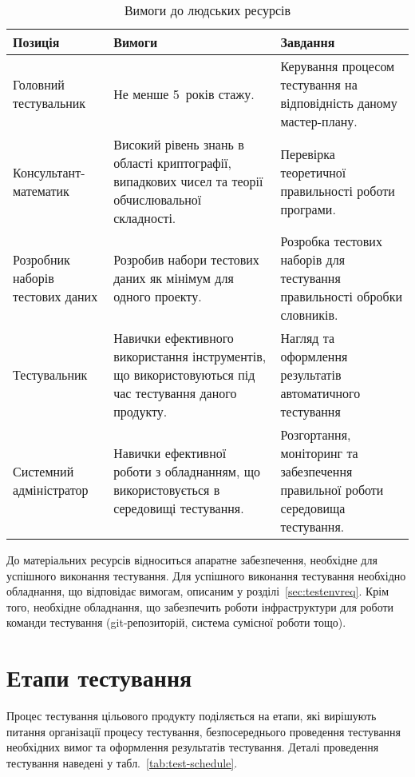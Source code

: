 \documentclass[a4paper,oneside,DIV=12,12pt]{scrartcl}
\begin{document}
		\begin{table}[h]
			\centering
			\begin{tabular}{v{0.2\textwidth}v{0.25\textwidth}v{0.4\textwidth}}
				\toprule
				Позиція & Вимоги & Завдання \\
				\midrule
				Головний тестувальник &
				Не менше 5~років стажу. &
				Керування процесом тестування на відповідність даному мастер-плану. \\
				
				Консультант-математик &
				Високий рівень знань в області криптографії, випадкових чисел та теорії обчислювальної складності. &
				Перевірка теоретичної правильності роботи програми. \\
				
				Розробник наборів тестових даних &
				Розробив набори тестових даних як мінімум для одного проекту. &
				Розробка тестових наборів для тестування правильності обробки словників. \\

				Тестувальник &
				Навички ефективного використання інструментів, що використовуються під час тестування даного продукту. &
				Нагляд та оформлення результатів автоматичного тестування\\
				
				Системний адміністратор &
				Навички ефективної роботи з обладнанням, що використовується в середовищі тестування. &
				Розгортання, моніторинг та забезпечення правильної роботи середовища тестування. \\
				\bottomrule
			\end{tabular}
		\caption{Вимоги до людських ресурсів}
		\label{tab:human-resources-requirements}
		\end{table}
		
		До матеріальних ресурсів відноситься апаратне забезпечення, необхідне для успішного виконання тестування. Для успішного виконання тестування необхідно обладнання, що відповідає вимогам, описаним у розділі~\ref{sec:testenvreq}. Крім того, необхідне обладнання, що забезпечить роботи інфраструктури для роботи команди тестування (git-репозиторій, система сумісної роботи тощо).
		
    \section{Етапи тестування}
		\label{sec:test-schedule}
		
		Процес тестування цільового продукту поділяється на етапи, які вирішують питання організації процесу тестування, безпосереднього проведення тестування необхідних вимог та оформлення результатів тестування. Деталі проведення тестування наведені у табл.~\ref{tab:test-schedule}.
		
\end{document}
